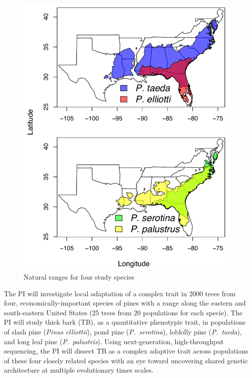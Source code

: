 \begin{figure}
\vspace{-30pt}
\centering
\includegraphics[scale=0.7]{rangemap}
\caption{Natural ranges for four study species}
\label{f:range}
\vspace{-10pt}
\end{figure}



The PI will investigate local adaptation of a complex trait in 2000 trees from four, economically-important species of pines with a range along 
the eastern and south-eastern United States (25 trees from 20 populations for each specie).  The PI will study 
thick bark (TB), as a quantitative phenotypic trait, in populations of slash pine (\emph{Pinus elliottii}), pond pine (\emph{P.\ serotina}), 
loblolly pine (\emph{P.\ taeda}), and long leaf pine (\emph{P.\ palustris}).  Using next-generation, high-throughput sequencing, the PI 
will dissect TB as a complex adaptive trait across populations of these four closely related species 
with an eye toward uncovering shared genetic architecture at multiple evolutionary times scales.  

